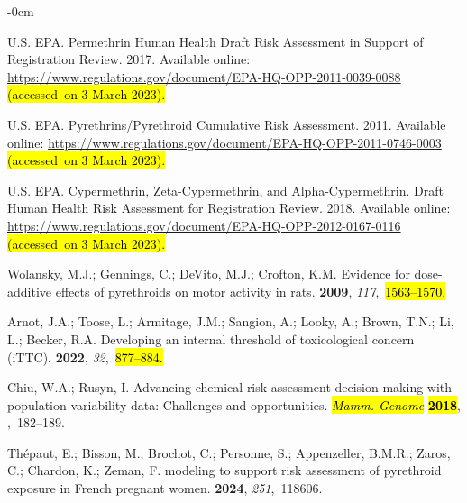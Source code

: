 \documentclass[toxics,article,accept,pdftex,moreauthors]{Definitions/mdpi}
\begin{document}
\begin{adjustwidth}{-\extralength}{0cm}
\begin{thebibliography}{999}
{U.S. EPA}.
\newblock Permethrin Human Health Draft Risk Assessment in Support of
  Registration Review.  2017.
\newblock Available online:
  \url{https://www.regulations.gov/document/EPA-HQ-OPP-2011-0039-0088} \hl{(accessed~on 3 March 2023).}

{U.S. EPA}.
\newblock Pyrethrins/Pyrethroid Cumulative Risk Assessment.  2011.
\newblock Available online:
  \url{https://www.regulations.gov/document/EPA-HQ-OPP-2011-0746-0003} \hl{(accessed~on 3 March 2023).}

{U.S. EPA}.
\newblock Cypermethrin, Zeta-Cypermethrin, and Alpha-Cypermethrin. Draft Human
  Health Risk Assessment for Registration Review.  2018.
\newblock Available online:
  \url{https://www.regulations.gov/document/EPA-HQ-OPP-2012-0167-0116} \hl{(accessed~on 3 March 2023).}

Wolansky, M.J.; Gennings, C.; DeVito, M.J.; Crofton, K.M.
\newblock Evidence for {dose}-{additive} {effects} of {pyrethroids} on {motor}
  {activity} in {rats}.
 {\bf 2009}, {\em
  117},~\hl{1563--1570.} %


Arnot, J.A.; Toose, L.; Armitage, J.M.; Sangion, A.; Looky, A.; Brown, T.N.;
  Li, L.; Becker, R.A.
\newblock Developing an internal threshold of toxicological concern ({iTTC}).
 {\bf
  2022}, {\em 32},~\hl{877--884.} %


Chiu, W.A.; Rusyn, I.
\newblock Advancing chemical risk assessment decision-making with population
  variability data: Challenges and opportunities. \emph{\hl{Mamm. Genome} %
} \textbf{\hl{2018}},
,~182--189.

Thépaut, E.; Bisson, M.; Brochot, C.; Personne, S.; Appenzeller, B.M.R.;
  Zaros, C.; Chardon, K.; Zeman, F.
 modeling to support risk assessment of pyrethroid exposure in
  {French} pregnant women.
 {\bf 2024}, {\em 251},~118606.


\end{thebibliography}
\end{adjustwidth}
\end{document}
